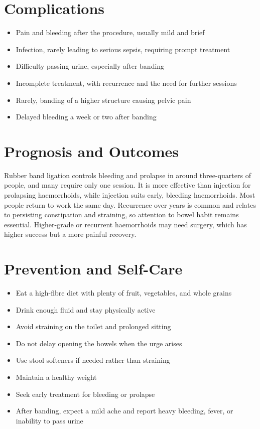 \section*{Complications}
\begin{itemize}
    \item Pain and bleeding after the procedure, usually mild and brief
    \item Infection, rarely leading to serious sepsis, requiring prompt treatment
    \item Difficulty passing urine, especially after banding
    \item Incomplete treatment, with recurrence and the need for further sessions
    \item Rarely, banding of a higher structure causing pelvic pain
    \item Delayed bleeding a week or two after banding
\end{itemize}

\section*{Prognosis and Outcomes}
Rubber band ligation controls bleeding and prolapse in around three-quarters of people, and many require only one session. It is more effective than injection for prolapsing haemorrhoids, while injection suits early, bleeding haemorrhoids. Most people return to work the same day. Recurrence over years is common and relates to persisting constipation and straining, so attention to bowel habit remains essential. Higher-grade or recurrent haemorrhoids may need surgery, which has higher success but a more painful recovery.

\section*{Prevention and Self-Care}
\begin{itemize}
    \item Eat a high-fibre diet with plenty of fruit, vegetables, and whole grains
    \item Drink enough fluid and stay physically active
    \item Avoid straining on the toilet and prolonged sitting
    \item Do not delay opening the bowels when the urge arises
    \item Use stool softeners if needed rather than straining
    \item Maintain a healthy weight
    \item Seek early treatment for bleeding or prolapse
    \item After banding, expect a mild ache and report heavy bleeding, fever, or inability to pass urine
\end{itemize}

